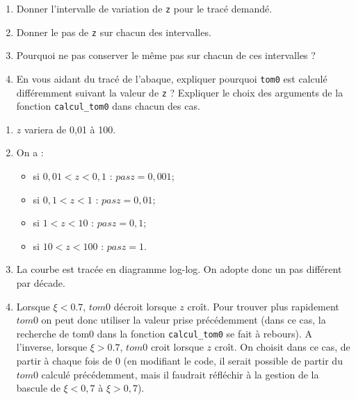  
\begin{question}
\begin{enumerate}
\item Donner l'intervalle de variation de \lstinline{z} pour le tracé demandé.
\item Donner le pas de \lstinline{z} sur chacun des intervalles.
\item Pourquoi ne pas conserver le même pas sur chacun de ces intervalles ?
\item En vous aidant du tracé de l'abaque, expliquer pourquoi \lstinline{tom0} est calculé différemment suivant la valeur de \lstinline{z} ? Expliquer le choix des arguments de la fonction \lstinline{calcul_tom0} dans chacun des cas. 
\end{enumerate}
\end{question}
\ifprof
\begin{corrige}
\begin{enumerate}
\item $z$ variera de 0,01 à 100.
\item On a : 
\begin{itemize}
\item si $0,01<z<0,1$ : $pasz = 0,001$;
\item si $0,1<z<1$ : $pasz = 0,01$;
\item si $1<z<10$ : $pasz = 0,1$;
\item si $10<z<100$ : $pasz = 1$.
\end{itemize}
\item La courbe est tracée en diagramme log-log. On adopte donc un pas différent par décade. 
\item Lorsque $\xi<0.7$, $tom0$ décroit lorsque $z$ croît. Pour trouver plus rapidement $tom0$ on peut donc utiliser la valeur prise précédemment (dans ce cas, la recherche de tom0 dans la fonction \lstinline{calcul_tom0} se fait à rebours). A l'inverse, lorsque $\xi>0.7$, $tom0$ croit lorsque $z$ croît. On choisit dans ce cas, de partir à chaque fois de 0 (en modifiant le code, il serait possible de partir du $tom0$ calculé précédemment, mais il faudrait réfléchir à la gestion de la bascule de $\xi<0,7$ à $\xi>0,7$).
\end{enumerate}
\end{corrige}
\else
\fi
%
%
%
\ifprof
\else

